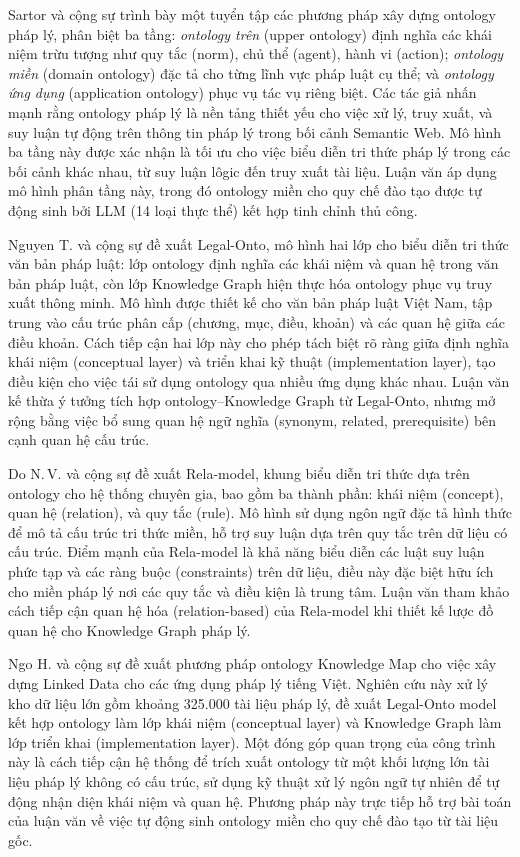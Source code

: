Sartor và cộng sự \cite{sartor2011legalonto} trình bày một tuyển tập các phương pháp
xây dựng ontology pháp lý, phân biệt ba tầng: \textit{ontology trên} (upper ontology)
định nghĩa các khái niệm trừu tượng như quy tắc (norm), chủ thể (agent), hành vi
(action); \textit{ontology miền} (domain ontology) đặc tả cho từng lĩnh vực pháp
luật cụ thể; và \textit{ontology ứng dụng} (application ontology) phục vụ tác vụ
riêng biệt. Các tác giả nhấn mạnh rằng ontology pháp lý là nền tảng thiết yếu cho
việc xử lý, truy xuất, và suy luận tự động trên thông tin pháp lý trong bối cảnh
Semantic Web. Mô hình ba tầng này được xác nhận là tối ưu cho việc biểu diễn tri
thức pháp lý trong các bối cảnh khác nhau, từ suy luận lôgic đến truy xuất tài liệu.
Luận văn áp dụng mô hình phân tầng này, trong đó ontology miền cho quy chế đào tạo
được tự động sinh bởi LLM (14 loại thực thể) kết hợp tinh chỉnh thủ công.

Nguyen T. và cộng sự \cite{nguyen2022legalonto} đề xuất Legal-Onto, mô hình hai lớp
cho biểu diễn tri thức văn bản pháp luật: lớp ontology định nghĩa các khái niệm
và quan hệ trong văn bản pháp luật, còn lớp Knowledge Graph hiện thực hóa
ontology phục vụ truy xuất thông minh. Mô hình được thiết kế cho văn bản pháp luật
Việt Nam, tập trung vào cấu trúc phân cấp (chương, mục, điều, khoản) và các quan
hệ giữa các điều khoản. Cách tiếp cận hai lớp này cho phép tách biệt rõ ràng giữa
định nghĩa khái niệm (conceptual layer) và triển khai kỹ thuật (implementation
layer), tạo điều kiện cho việc tái sử dụng ontology qua nhiều ứng dụng khác nhau.
Luận văn kế thừa ý tưởng tích hợp ontology--Knowledge Graph từ Legal-Onto, nhưng
mở rộng bằng việc bổ sung quan hệ ngữ nghĩa (synonym, related, prerequisite) bên
cạnh quan hệ cấu trúc.

Do N.\,V. và cộng sự \cite{do2018rela} đề xuất Rela-model, khung biểu diễn tri thức dựa
trên ontology cho hệ thống chuyên gia, bao gồm ba thành phần: khái niệm (concept),
quan hệ (relation), và quy tắc (rule). Mô hình sử dụng ngôn ngữ đặc tả hình thức
để mô tả cấu trúc tri thức miền, hỗ trợ suy luận dựa trên quy tắc trên dữ liệu
có cấu trúc. Điểm mạnh của Rela-model là khả năng biểu diễn các luật suy luận phức
tạp và các ràng buộc (constraints) trên dữ liệu, điều này đặc biệt hữu ích cho
miền pháp lý nơi các quy tắc và điều kiện là trung tâm. Luận văn tham khảo cách
tiếp cận quan hệ hóa (relation-based) của Rela-model khi thiết kế lược đồ quan hệ
cho Knowledge Graph pháp lý.

Ngo H. và cộng sự \cite{ngo2024ontology} đề xuất phương pháp ontology Knowledge Map
cho việc xây dựng Linked Data cho các ứng dụng pháp lý tiếng Việt. Nghiên cứu này
xử lý kho dữ liệu lớn gồm khoảng 325.000 tài liệu pháp lý, đề xuất Legal-Onto
model kết hợp ontology làm lớp khái niệm (conceptual layer) và Knowledge Graph làm
lớp triển khai (implementation layer). Một đóng góp quan trọng của công trình này là
cách tiếp cận hệ thống để trích xuất ontology từ một khối lượng lớn tài liệu pháp
lý không có cấu trúc, sử dụng kỹ thuật xử lý ngôn ngữ tự nhiên để tự động nhận
diện khái niệm và quan hệ. Phương pháp này trực tiếp hỗ trợ bài toán của luận văn
về việc tự động sinh ontology miền cho quy chế đào tạo từ tài liệu gốc.

